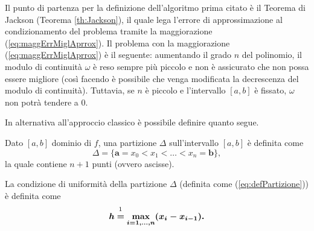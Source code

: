Il punto di partenza per la definizione dell'algoritmo prima citato è il Teorema di Jackson (Teorema \ref{th:Jackson}), il quale lega l'errore di approssimazione al condizionamento del problema tramite la maggiorazione (\ref{eq:maggErrMiglAprrox}). Il problema con la maggiorazione (\ref{eq:maggErrMiglAprrox}) è il seguente: aumentando il grado $n$ del polinomio, il modulo di continuità $\omega$ è reso sempre più piccolo e non è assicurato che non possa essere migliore (così facendo è possibile che venga modificata la decrescenza del modulo di continuità). Tuttavia, se $n$ è piccolo e l'intervallo $[a,b]$ è fissato, $\omega$ non potrà tendere a 0.

In alternativa all'approccio classico è possibile definire quanto segue.

\begin{definition}
    Dato $[a,b]$ dominio di $f$, una partizione $\Delta$ sull'intervallo $[a,b]$ è definita come
    \begin{equation}\label{eq:defPartizione}
            \Delta = \{\boldsymbol{a}=x_0<x_1<\hdots<x_n=\boldsymbol{b}\},
    \end{equation}
    la quale contiene $n+1$ punti (ovvero ascisse).
\end{definition}

\begin{definition}
    La condizione di uniformità della partizione $\Delta$ (definita come (\ref{eq:defPartizione})) è definita come
    \begin{equation}\label{eq:condUnifPart}
        \boldsymbol h\overset{\footnotemark}{\boldsymbol =}\underset{\boldsymbol{i=1,\hdots,n}}{\boldsymbol\max}\boldsymbol{(x_i-x_{i-1}).}
    \end{equation}
\end{definition}


